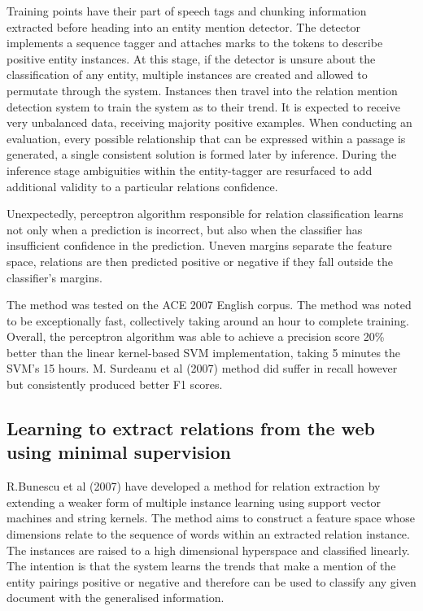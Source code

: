 \documentclass{ecmm427_assignment}
\begin{document}
Training points have their part of speech tags and chunking information extracted before heading into an entity mention detector. The detector implements a sequence tagger and attaches marks to the tokens to describe positive entity instances. At this stage, if the detector is unsure about the classification of any entity, multiple instances are created and allowed to permutate through the system. Instances then travel into the relation mention detection system to train the system as to their trend. It is expected to receive very unbalanced data, receiving majority positive examples. When conducting an evaluation, every possible relationship that can be expressed within a passage is generated, a single consistent solution is formed later by inference. During the inference stage ambiguities within the entity-tagger are resurfaced to add additional validity to a particular relations confidence.

Unexpectedly, perceptron algorithm responsible for relation classification learns not only when a prediction is incorrect, but also when the classifier has insufficient confidence in the prediction. Uneven margins separate the feature space, relations are then predicted positive or negative if they fall outside the classifier's margins. 

The method was tested on the ACE 2007 English corpus. The method was noted to be exceptionally fast, collectively taking around an hour to complete training. Overall, the perceptron algorithm was able to achieve a precision score 20\% better than the linear kernel-based SVM implementation, taking 5 minutes the SVM's 15 hours. M. Surdeanu et al (2007) method did suffer in recall however but consistently produced better F1 scores.  

\subsection{Learning to extract relations from the web using minimal supervision} 

R.Bunescu et al (2007) have developed a method for relation extraction by extending a weaker form of multiple instance learning using support vector machines and string kernels. The method aims to construct a feature space whose dimensions relate to the sequence of words within an extracted relation instance. The instances are raised to a high dimensional hyperspace and classified linearly. The intention is that the system learns the trends that make a mention of the entity pairings positive or negative and therefore can be used to classify any given document with the generalised information.
\end{document}
